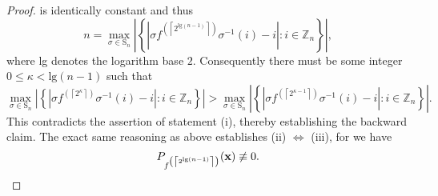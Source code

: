 \begin{proof}
is identically constant and thus 
\begin{equation}
n=\max_{\sigma\in\text{S}_{n}}\left|\left\{ |\sigma f^{(\left\lceil 2^{\text{lg}(n-1)}\right\rceil )}\sigma^{-1}(i)-i|:i\in\mathbb{Z}_{n}\right\} \right|,
\end{equation}
where lg denotes the logarithm base $2$. Consequently there must
be some integer $0\le\kappa<\text{lg}(n-1)$ such that 
\begin{equation}
\max_{\sigma\in\text{S}_{n}}\left|\left\{ |\sigma f^{(\left\lceil 2^{\kappa}\right\rceil )}\sigma^{-1}(i)-i|:i\in\mathbb{Z}_{n}\right\} \right|>\max_{\sigma\in\text{S}_{n}}\left|\left\{ |\sigma f^{(\left\lceil 2^{\kappa-1}\right\rceil )}\sigma^{-1}(i)-i|:i\in\mathbb{Z}_{n}\right\} \right|.
\end{equation}
This contradicts the assertion of statement (i), thereby
establishing the backward claim. 
The exact same reasoning as above establishes (ii) $\iff$ (iii), for we have
\begin{equation}
        P_{f^{\left(\left\lceil 2^{\text{lg}(n-1)}\right\rceil \right)}} ({\bf x}) \not\equiv 0. 
\end{equation}
\end{proof}

